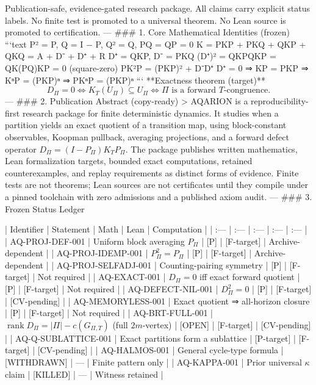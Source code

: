 Publication-safe, evidence-gated research package.  
All claims carry explicit status labels. No finite test is promoted to a universal theorem. No Lean source is promoted to certification.
---
### 1. Core Mathematical Identities (frozen)
```text
P² = P,   Q = I − P,   Q² = Q,   PQ = QP = 0
K = PKP + PKQ + QKP + QKQ = A + D⁻ + D⁺ + R
D⁺ = QKP,   D⁻ = PKQ
(D⁺)² = QKPQKP = QK(PQ)KP = 0          (square-zero)
PK²P = (PKP)² + D⁻D⁺
D⁺ = 0  ⇒  KP = PKP  ⇒  KⁿP = (PKP)ⁿ  ⇒  PKⁿP = (PKP)ⁿ
```
**Exactness theorem (target)**  
\[
D_\Pi = 0
\Longleftrightarrow
K_T(U_\Pi)\subseteq U_\Pi
\Longleftrightarrow
\Pi\text{ is a forward }T\text{-congruence}.
\]
---
### 2. Publication Abstract (copy-ready)
> AQARION is a reproducibility-first research package for finite deterministic dynamics. It studies when a partition yields an exact quotient of a transition map, using block-constant observables, Koopman pullback, averaging projections, and a forward defect operator \(D_\Pi=(I-P_\Pi)K_TP_\Pi\). The package publishes written mathematics, Lean formalization targets, bounded exact computations, retained counterexamples, and replay requirements as distinct forms of evidence. Finite tests are not theorems; Lean sources are not certificates until they compile under a pinned toolchain with zero admissions and a published axiom audit.
---
### 3. Frozen Status Ledger

| Identifier | Statement | Math | Lean | Computation |
| :--- | :--- | :--- | :--- | :--- |
| AQ-PROJ-DEF-001 | Uniform block averaging \(P_\Pi\) | [P] | [F-target] | Archive-dependent |
| AQ-PROJ-IDEMP-001 | \(P_\Pi^2=P_\Pi\) | [P] | [F-target] | Archive-dependent |
| AQ-PROJ-SELFADJ-001 | Counting-pairing symmetry | [P] | [F-target] | Not required |
| AQ-EXACT-001 | \(D_\Pi=0\) iff exact forward quotient | [P] | [F-target] | Not required |
| AQ-DEFECT-NIL-001 | \(D_\Pi^2=0\) | [P] | [F-target] | [CV-pending] |
| AQ-MEMORYLESS-001 | Exact quotient ⇒ all-horizon closure | [P] | [F-target] | Not required |
| AQ-BRT-FULL-001 | \(\operatorname{rank}D_\Pi= | \Pi | -c(G_{\Pi,T})\) (full \(2m\)-vertex) | [OPEN] | [F-target] | [CV-pending] |
| AQ-Q-SUBLATTICE-001 | Exact partitions form a sublattice | [P-target] | [F-target] | [CV-pending] |
| AQ-HALMOS-001 | General cycle-type formula | [WITHDRAWN] | — | Finite pattern only |
| AQ-KAPPA-001 | Prior universal \(\kappa\) claim | [KILLED] | — | Witness retained |

